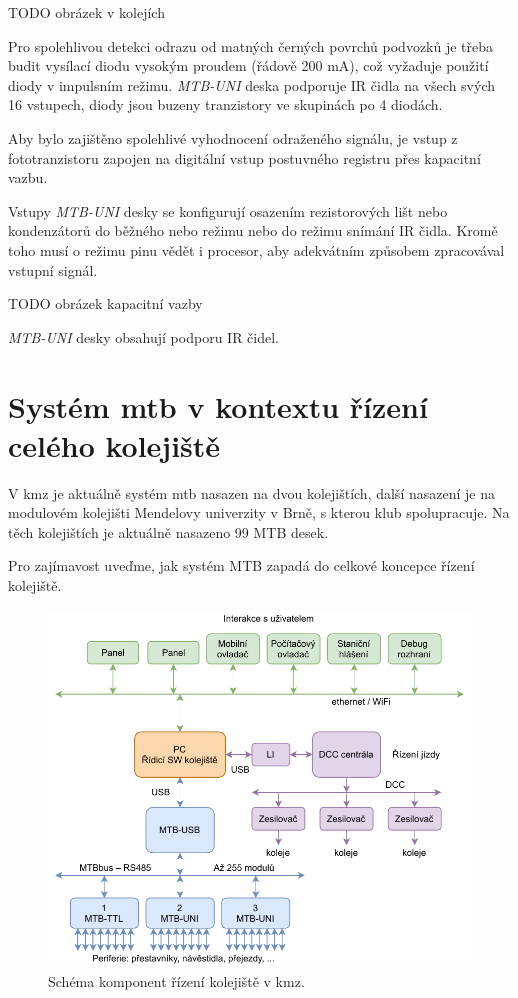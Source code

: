 TODO obrázek v kolejích

Pro spolehlivou detekci odrazu od matných černých povrchů podvozků je třeba
budit vysílací diodu vysokým proudem (řádově 200 mA), což vyžaduje použití
diody v impulsním režimu. \textit{MTB-UNI} deska podporuje IR čidla na všech
svých 16 vstupech, diody jsou buzeny tranzistory ve skupinách po 4 diodách.

Aby bylo zajištěno spolehlivé vyhodnocení odraženého signálu, je vstup z
fototranzistoru zapojen na digitální vstup postuvného registru přes kapacitní
vazbu.

Vstupy \textit{MTB-UNI} desky se konfigurují osazením rezistorových lišt nebo
kondenzátorů do běžného nebo režimu nebo do režimu snímání IR čidla. Kromě
toho musí o režimu pinu vědět i procesor, aby adekvátním způsobem zpracovával
vstupní signál.

TODO obrázek kapacitní vazby

\textit{MTB-UNI} desky obsahují podporu IR čidel.

\section{Systém \gls{mtb} v kontextu řízení celého kolejiště} \label{sec:mtb_context}

V \gls{kmz} je aktuálně systém \gls{mtb} nasazen na dvou kolejištích, další
nasazení je na modulovém kolejišti Mendelovy univerzity v Brně, s kterou klub
spolupracuje. Na těch kolejištích je aktuálně nasazeno 99 MTB desek.

Pro zajímavost uveďme, jak systém MTB zapadá do celkové koncepce řízení
kolejiště.

\begin{figure}[ht]
\includegraphics[width=\textwidth]{data/railroad-topology.pdf}
\caption{Schéma komponent řízení kolejiště v \gls{kmz}.}
\label{fig:railroad-topology}
\end{figure}

